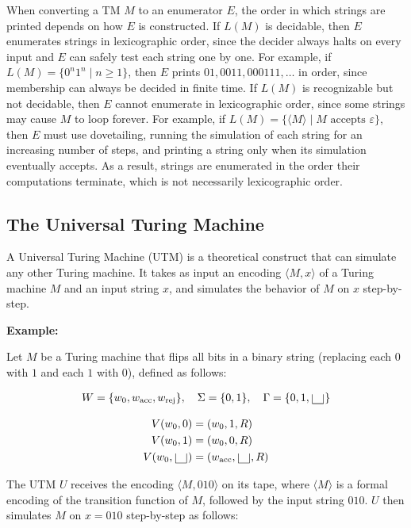 \documentclass[12pt,a4paper,openany]{article}
\begin{document}
When converting a TM $M$ to an enumerator $E$, the order in which strings
are printed depends on how $E$ is constructed. If $L(M)$ is decidable, then
$E$ enumerates strings in lexicographic order, since the decider always
halts on every input and $E$ can safely test each string one by one. For
example, if $L(M) = \{0^n 1^n \mid n \geq 1\}$, then $E$ prints $01, 0011,
000111, \ldots$ in order, since membership can always be decided in finite
time. If $L(M)$ is recognizable but not decidable, then $E$ cannot enumerate
in lexicographic order, since some strings may cause $M$ to loop forever.
For example, if $L(M) = \{\langle M \rangle \mid M \text{ accepts } \varepsilon\}$,
then $E$ must use dovetailing, running the simulation of each string for an
increasing number of steps, and printing a string only when its simulation
eventually accepts. As a result, strings are enumerated in the order their
computations terminate, which is not necessarily lexicographic order.

\subsection{The Universal Turing Machine}

A Universal Turing Machine (UTM) is a theoretical construct that can simulate any other Turing machine.
It takes as input an encoding \(\langle M, x \rangle\) of a Turing machine \(M\) and an input string \(x\),
and simulates the behavior of \(M\) on \(x\) step-by-step.

\textbf{Example:}

Let \(M\) be a Turing machine that flips all bits in a binary string (replacing each \(0\) with \(1\) and each \(1\) with \(0\)), defined as follows:

\begin{align*}
    W = \{w_0, w_{\text{acc}}, w_{\text{rej}}\}, \quad
    \Sigma = \{0, 1\}, \quad
    \Gamma = \{0, 1, \scalebox{2.5}{\textvisiblespace}\}
\end{align*}

\begin{align*}
    V(w_0, 0) &= (w_0, 1, R) \\
    V(w_0, 1) &= (w_0, 0, R) \\
    V(w_0, \scalebox{2.5}{\textvisiblespace}) &= (w_{\text{acc}}, \scalebox{2.5}{\textvisiblespace}, R)
\end{align*}

The UTM \(U\) receives the encoding \(\langle M, 010 \rangle\) on its tape, where \(\langle M \rangle\) is a
formal encoding of the transition function of \(M\), followed by the input string \(010\).
\(U\) then simulates \(M\) on \(x = 010\) step-by-step as follows:
\end{document}
